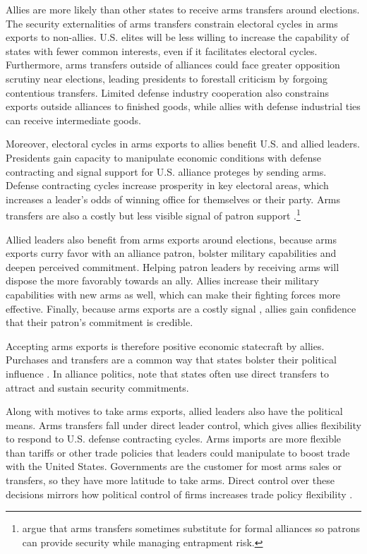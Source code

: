\documentclass[12pt]{article}
\begin{document}
Allies are more likely than other states to receive arms transfers around elections.
The security externalities of arms transfers constrain electoral cycles in arms exports to non-allies. 
U.S. elites will be less willing to increase the capability of states with fewer common interests, even if it facilitates electoral cycles.
Furthermore, arms transfers outside of alliances could face greater opposition scrutiny near elections, leading presidents to forestall criticism by forgoing contentious transfers.
Limited defense industry cooperation also constrains exports outside alliances to finished goods, while allies with defense industrial ties can receive intermediate goods.


Moreover, electoral cycles in arms exports to allies benefit U.S. and allied leaders.
Presidents gain capacity to manipulate economic conditions with defense contracting and signal support for U.S. alliance proteges by sending arms.
Defense contracting cycles increase prosperity in key electoral areas, which increases a leader's odds of winning office for themselves or their party. 
Arms transfers are also a costly but less visible signal of patron support \citet{McManusYarhi-Milo2017}.\footnote{\citet{Yarhi-Miloetal2016} argue that arms transfers sometimes substitute for formal alliances so patrons can provide security while managing entrapment risk.}


Allied leaders also benefit from arms exports around elections, because arms exports curry favor with an alliance patron, bolster military capabilities and deepen perceived commitment.
Helping patron leaders by receiving arms will dispose the more favorably towards an ally. 
Allies increase their military capabilities with new arms as well, which can make their fighting forces more effective. 
Finally, because arms exports are a costly signal \citep{McManusYarhi-Milo2017}, allies gain confidence that their patron's commitment is credible. 


Accepting arms exports is therefore positive economic statecraft by allies. 
Purchases and transfers are a common way that states bolster their political influence \citep[pg. 42-3]{Baldwin2020}.
In alliance politics, \citet[pg. 184-5]{IkenberryGrieco2003} note that states often use direct transfers to attract and sustain security commitments.  


Along with motives to take arms exports, allied leaders also have the political means. 
Arms transfers fall under direct leader control, which gives allies flexibility to respond to U.S. defense contracting cycles.
Arms imports are more flexible than tariffs or other trade policies that leaders could manipulate to boost trade with the United States.
Governments are the customer for most arms sales or transfers, so they have more latitude to take arms.
Direct control over these decisions mirrors how political control of firms increases trade policy flexibility \citep{Davisetal2019}.
\end{document}
